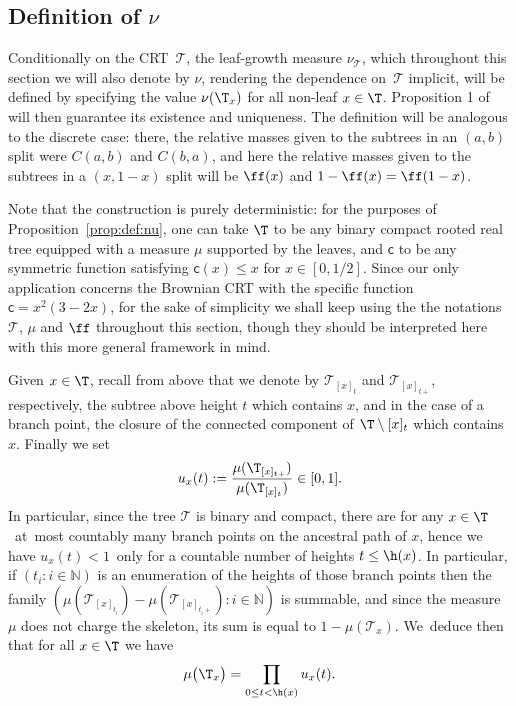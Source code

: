 \subsection{Definition of $\nu$}
Conditionally on the CRT~$\mathcal{T}$, the leaf-growth measure $\nu_{\mathcal{T}}$, which throughout this section we will also denote by $\nu$, rendering the dependence on~$\mathcal{T}$ implicit, will be defined by specifying the value $\nu(\T_x)$ for all non-leaf $x\in\T$. Proposition 1 of \cite{Steph13} will then guarantee its existence and uniqueness. The definition will be analogous to the discrete case: there, the relative masses given to the subtrees in an $(a,b)$ split were $C(a,b)$ and $C(b,a)$, and here the relative masses given to the subtrees in a $(x,1-x)$ split will be $\ff(x)$ and $1-\ff(x)=\ff(1-x)$.

Note that the construction is purely deterministic: for the purposes of Proposition~\ref{prop:def:nu}, one can take $\T$ to be any binary compact rooted real tree equipped with a measure $\mu$ supported by the leaves, and $ \mathsf{c}$ to be any symmetric function satisfying $ \mathsf{c}(x) \leq x$ for $x \in [0,1/2]$. Since our only application concerns the Brownian CRT with the specific function $\mathsf{c}=x^2(3-2x)$, for the sake of simplicity we shall keep using the the notations $\mathcal{T}$, $\mu$ and $\ff$ throughout this section, though they should be interpreted here with this more general framework in mind.

Given $x \in \T$, recall from above that we denote by $ \mathcal{T}_{[x]_t}$ and $\mathcal{T}_{[x]_{t+}}$, respectively, the subtree above height $t$ which contains $x$, and in the case of a branch point, the closure of the connected component of $\T\setminus{[x]_t}$ which contains $x$. Finally we set
\[
u_x(t) := \frac{\mu(\T_{[x]_{t+}})}{ \mu(\T_{[x]_t})} \in [0,1].
\]
In particular, since the tree $ \mathcal{T}$ is binary and compact, there are for any \hbox{$x \in \T$}~at~most countably many branch points on the ancestral path of $x$, hence we have \hbox{$u_x(t) < 1$}~only for a countable number of heights $t \leq \h(x)$. In particular, if $(t_i : i \in \mathbb{N})$ is an enumeration of the heights of those branch points then the family \hbox{$ (\mu(\mathcal{T}_{[x]_{t_i}})-\mu(\mathcal{T}_{[x]_{t_i +}}): i \in \mathbb{N})$} is summable, and since the measure $\mu$ does not charge the skeleton, its sum is equal to $1- \mu(\mathcal{T}_x)$. We~deduce then that for all $x \in \T$ we have
\begin{equation} \mu\big(\T_x\big) = \prod_{0 \leq t < \h(x)} u_x(t). \label{eq:noloss}\end{equation}


